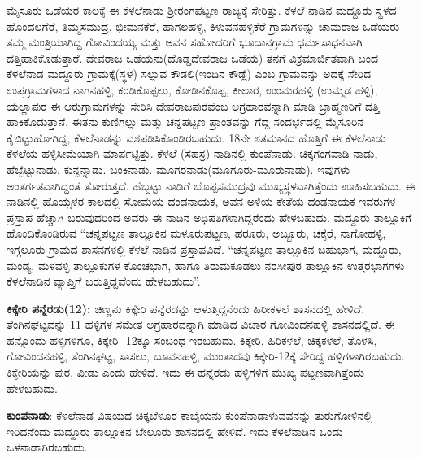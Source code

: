 ಮೈಸೂರು ಒಡೆಯರ ಕಾಲಕ್ಕೆ ಈ ಕೆಳಲೆನಾಡು ಶ‍್ರೀರಂಗಪಟ್ಟಣ ರಾಜ್ಯಕ್ಕೆ ಸೇರಿತ್ತು. ಕೆಳಲೆ ನಾಡಿನ ಮದ್ದೂರು ಸ್ಥಳದ ಹೊಂದಲಗೆರೆ, ತಿಮ್ಮಸಮುದ್ರ, ಭೀಮನಕೆರೆ, ಹಾಗಲಹಳ್ಳಿ, ಕಿಳುವನಹಳ್ಳಿಕೆರೆ ಗ್ರಾಮಗಳನ್ನು ಚಾಮರಾಜ ಒಡೆಯರು ತಮ್ಮ ಮಂತ್ರಿಯಾಗಿದ್ದ ಗೋವಿಂದಯ್ಯ ಮತ್ತು ಅವನ ಸಹೋದರಿಗೆ ಭೂದಾನಗ್ರಾಮ ಧರ್ಮಸಾಧನವಾಗಿ ದತ್ತಿಹಾಕಿಕೊಡುತ್ತಾರೆ. ದೇವರಾಜ ಒಡೆಯನು(ದೊಡ್ಡದೇವರಾಜ ಒಡೆಯ) ತನಗೆ ವಿಕ್ರಮಾರ್ಜಿತವಾಗಿ ಬಂದ ಕೆಳಲೆನಾಡ ಮದ್ದೂರು ಗ್ರಾಮಕ್ಕೆ(ಸ್ಥಳ) ಸಲ್ಲುವ ಕೌಡಲಿ(ಇಂದಿನ ಕೌಡ್ಲೆ) ಎಂಬ ಗ್ರಾಮವನ್ನು ಅದಕ್ಕೆ ಸೇರಿದ ಉಪಗ್ರಾಮಗಳಾದ ನಾಗನಹಳ್ಳಿ, ಕರಡಿಕೊಪ್ಪಲು, ಕೋಡಿನಕೊಪ್ಪ, ಕೀಲಾರ, ಉಂಮರಹಳ್ಳಿ (ಉಮ್ಮಡ ಹಳ್ಳಿ), ಯಲ್ಲಾಪುರ ಈ ಆರುಗ್ರಾಮಗಳನ್ನು ಸೇರಿಸಿ ದೇವರಾಜಪುರವೆಂಬ ಅಗ್ರಹಾರವನ್ನಾಗಿ ಮಾಡಿ ಬ್ರಾಹ್ಮಣರಿಗೆ ದತ್ತಿ ಹಾಕಿಕೊಡುತ್ತಾನೆ. ಈತನು ಕುಣಿಗಲ್ಲು ಮತ್ತು ಚನ್ನಪಟ್ಟಣ ಪ್ರಾಂತವನ್ನು ಗೆದ್ದ ಸಂದರ್ಭದಲ್ಲಿ ಮೈಸೂರಿನ ಕೈಬಿಟ್ಟುಹೋಗಿದ್ದ, ಕೆಳಲೆನಾಡನ್ನು ವಶಪಡಿಸಿಕೊಂಡಿರಬಹುದು. 18ನೇ ಶತಮಾನದ ಹೊತ್ತಿಗೆ ಈ ಕೆಳಲೆನಾಡು ಕೆಳಲೆಯ ಹಳ್ಳಿಸೀಮೆಯಾಗಿ ಮಾರ್ಪಟ್ಟಿತ್ತು. ಕೆಳಲೆ (ಸಹಸ್ರ) ನಾಡಿನಲ್ಲಿ ಕುಂಪೆನಾಡು. ಚಿಕ್ಕಗಂಗವಾಡಿ ನಾಡು, ಹೆಬ್ಬೆಟ್ಟುನಾಡು. ಕುನ್ದನ್ನಾಡು. ಬಂಕಿನಾಡು. ಮೂಗರನಾಡು(ಮೂಗೂರು-ಮೂರುನಾಡು). ಇವುಗಳು ಅಂತರ್ಗತ\-ವಾಗಿದ್ದಂತೆ ತೋರುತ್ತದೆ. ಹೆಬ್ಬಟ್ಟು ನಾಡಿಗೆ ಬೊಪ್ಪಸಮುದ್ರವು ಮುಖ್ಯಸ್ಥಳವಾಗಿತ್ತೆಂದು ಊಹಿಸಬಹುದು. ಈ ನಾಡಿನಲ್ಲಿ ಹೊಯ್ಸಳರ ಕಾಲದಲ್ಲಿ ಸೋಮೆಯ ದಂಡನಾಯಕ, ಅವನ ಅಳಿಯ ಕೇತೆಯ ದಂಡನಾಯಕ ಇವರುಗಳ ಪ್ರಸ್ತಾಪ ಹೆಚ್ಚಾಗಿ ಬರುವುದರಿಂದ ಅವರು ಈ ನಾಡಿನ ಅಧಿಪತಿಗಳಾಗಿದ್ದರೆಂದು ಹೇಳಬಹುದು. ಮದ್ದೂರು ತಾಲ್ಲೂಕಿಗೆ ಹೊಂದಿಕೊಂಡಿರುವ “ಚನ್ನಪಟ್ಟಣ ತಾಲ್ಲೂಕಿನ ಮಳೂರುಪಟ್ಟಣ, ಹರೂರು, ಅಬ್ಬೂರು, ಚಕ್ಕೆರೆ, ನಾಗೋಹಳ್ಳಿ, ಇಗ್ಗಲೂರು ಗ್ರಾಮದ ಶಾಸನಗಳಲ್ಲಿ ಕೆಳಲೆ ನಾಡಿನ ಪ್ರಸ್ತಾಪವಿದೆ. “ಚನ್ನಪಟ್ಟಣ ತಾಲ್ಲೂಕಿನ ಬಹುಭಾಗ, ಮದ್ದೂರು, ಮಂಡ್ಯ, ಮಳವಳ್ಳಿ ತಾಲ್ಲೂಕುಗಳ ಕೊಂಚಭಾಗ, ಹಾಗೂ ತಿರುಮಕೂಡಲು ನರಸೀಪುರ ತಾಲ್ಲೂಕಿನ ಉತ್ತರಭಾಗಗಳು ಕೆಳಲೆನಾಡಿನ ವ್ಯಾಪ್ತಿಗೆ ಬರುತ್ತಿದ್ದವೆಂದು ಹೇಳಬಹುದು”.

\textbf{ಕಿಕ್ಕೇರಿ ಪನ್ನೆರಡು(12):} ಚಿಣ್ಣನು ಕಿಕ್ಕೇರಿ ಪನ್ನೆರಡನ್ನು ಆಳುತ್ತಿದ್ದನೆಂದು ಹಿರೀಕಳಲೆ ಶಾಸನದಲ್ಲಿ ಹೇಳಿದೆ. ತೆಂಗಿನಘಟ್ಟವನ್ನು 11 ಹಳ್ಳಿಗಳ ಸಮೇತ ಅಗ್ರಹಾರವನ್ನಾಗಿ ಮಾಡಿದ ವಿಚಾರ ಗೋವಿಂದನಹಳ್ಳಿ ಶಾಸನದಲ್ಲಿದೆ. ಈ ಹನ್ನೊಂದು ಹಳ್ಳಿಗಳಿಗೂ, ಕಿಕ್ಕೇರಿ- 12ಕ್ಕೂ ಸಂಬಂಧ ಇರಬಹುದು. ಕಿಕ್ಕೇರಿ, ಹಿರಿಕಳಲೆ, ಚಿಕ್ಕಕಳಲೆ, ತೊಳಸಿ, ಗೋವಿಂದನಹಳ್ಳಿ, ತೆಂಗಿನಘಟ್ಟ, ಸಾಸಲು, ಬೂವನಹಳ್ಳಿ, ಮುಂತಾದವು ಕಿಕ್ಕೇರಿ-12ಕ್ಕೆ ಸೇರಿದ್ದ ಹಳ್ಳಿಗಳಾಗಿರಬಹುದು. ಕಿಕ್ಕೇರಿಯನ್ನು ಪುರ, ವೀಡು ಎಂದು ಹೇಳಿದೆ. ಇದು ಈ ಹನ್ನೆರಡು ಹಳ್ಳಿಗಳಿಗೆ ಮುಖ್ಯ ಪಟ್ಟಣವಾಗಿತ್ತೆಂದು ಹೇಳಬಹುದು.

\textbf{ಕುಂಪೆನಾಡು}: ಕೆಳಲೆನಾಡ ವಿಷಯದ ಚಿಕ್ಕಬೆಳೂರ ಕಾಬೈಯನು ಕುಂಪೆನಾಡಾಳುವವನನ್ನು ತುರುಗೋಳಿನಲ್ಲಿ ಇರಿದನೆಂದು ಮದ್ದೂರು ತಾಲ್ಲೂಕಿನ ಬೇಲೂರು ಶಾಸನದಲ್ಲಿ ಹೇಳಿದೆ. ಇದು ಕೆಳಲೆನಾಡಿನ ಒಂದು ಒಳನಾಡಾಗಿರಬಹುದು.

